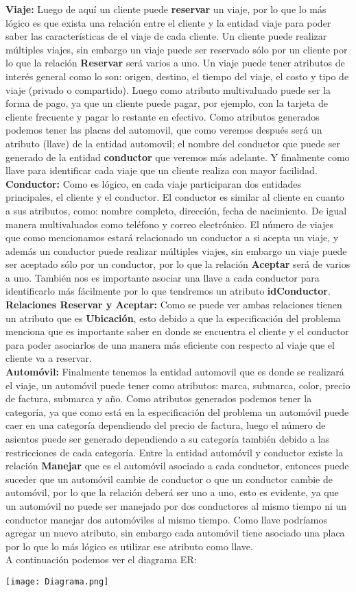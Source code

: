 \documentclass{article}
\begin{document}
\textbf{Viaje:} Luego de aquí un cliente puede \textbf{reservar} un viaje, por lo que lo más lógico es que exista una relación entre el cliente y la entidad viaje para poder saber las características de el viaje de cada cliente. Un cliente puede realizar múltiples viajes, sin embargo un viaje puede ser reservado sólo por un cliente por lo que la relación \textbf{Reservar} será varios a uno. Un viaje puede tener atributos de interés general como lo son: origen, destino, el tiempo del viaje, el costo y tipo de viaje (privado o compartido). Luego como atributo multivaluado puede ser la forma de pago, ya que un cliente puede pagar, por ejemplo, con la tarjeta de cliente frecuente y pagar lo restante en efectivo. Como atributos generados podemos tener las placas del automovil, que como veremos después será un atributo (llave) de la entidad automovil; el nombre del conductor que puede ser generado de la entidad \textbf{conductor} que veremos más adelante. Y finalmente como llave para identificar cada viaje que un cliente realiza con mayor facilidad.\\
\textbf{Conductor:} Como es lógico, en cada viaje participaran dos entidades principales, el cliente y el conductor. El conductor es similar al cliente en cuanto a sus atributos, como: nombre completo, dirección, fecha de nacimiento. De igual manera multivaluados como teléfono y correo electrónico. El número de viajes que como mencionamos estará relacionado un conductor a si acepta un viaje, y además un conductor puede realizar múltiples viajes, sin embargo un viaje puede ser aceptado sólo por un conductor, por lo que la relación \textbf{Aceptar} será de varios a uno. También nos es importante asociar una llave a cada conductor para identificarlo más fácilmente por lo que tendremos un atributo \textbf{idConductor}.\\
\textbf{Relaciones Reservar y Aceptar:} Como se puede ver ambas relaciones tienen un atributo que es \textbf{Ubicación}, esto debido a que la especificación del problema menciona que es importante saber en donde se encuentra el cliente y el conductor para poder asociarlos de una manera más eficiente con respecto al viaje que el cliente va a reservar.\\
\textbf{Automóvil:} Finalmente tenemos la entidad automovil que es donde se realizará el viaje, un automóvil puede tener como atributos: marca, submarca, color, precio de factura, submarca y año. Como atributos generados podemos tener la categoría, ya que como está en la especificación del problema un automóvil puede caer en una categoría dependiendo del precio de factura, luego el número de asientos puede ser generado dependiendo a su categoría también debido a las restricciones de cada categoría. Entre la entidad automóvil y conductor existe la relación \textbf{Manejar} que es el automóvil asociado a cada conductor, entonces puede suceder que un automóvil cambie de conductor o que un conductor cambie de automóvil, por lo que la relación deberá ser uno a uno, esto es evidente, ya que un automóvil no puede ser manejado por dos conductores al mismo tiempo ni un conductor manejar dos automóviles al mismo tiempo. Como llave podríamos agregar un nuevo atributo, sin embargo cada automóvil tiene asociado una placa por lo que lo más lógico es utilizar ese atributo como llave.\\
A continuación podemos ver el diagrama ER:

\begin{center}
    \texttt{[image: Diagrama.png]}
\end{center}
\end{document}
